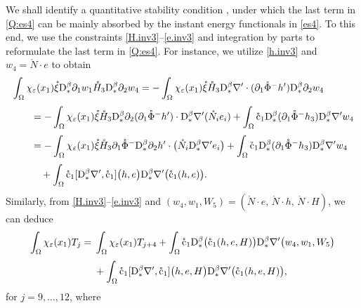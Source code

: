 \documentclass[twoside,11pt]{article}
\numberwithin{equation}{section}
\def\p{\partial}
\begin{document}
We shall identify a quantitative stability condition%
, under which
the last term in \eqref{Q:es4} can be mainly absorbed by the instant energy functionals in \eqref{es4}.
To this end, we use the constraints \eqref{H.inv3}--\eqref{e.inv3} and integration by parts to reformulate the last term in \eqref{Q:es4}.
For instance,
we utilize \eqref{h.inv3} and ${w_4}=\mathring{N}\cdot e$ to obtain
\begin{align} \nonumber
& \int_{\Omega} \chi_{\varepsilon}(x_1){\mathring{\xi} } \mathrm{D}_*^{\beta}\p_1 w_1{ \mathring{H}_3}  \mathrm{D}_*^{\beta}\p_2 {w_4}
	 =-	  \int_{\Omega} \chi_{\varepsilon}(x_1){\mathring{\xi} }{ \mathring{H}_3}   \mathrm{D}_*^{\beta}\nabla'\cdot(\p_1\mathring{\Phi}^-h')\mathrm{D}_*^{\beta}\p_2 {w_4}\\[1mm]
&\qquad =	-	   \int_{\Omega} \chi_{\varepsilon}(x_1){\mathring{\xi} }{ \mathring{H}_3}   \mathrm{D}_*^{\beta}\p_2(\p_1\mathring{\Phi}^-h') \cdot \mathrm{D}_*^{\beta}\nabla' (\mathring{N}_i e_i)
+\int_{\Omega} \mathring{\rm c}_1\mathrm{D}_*^{\beta}(\p_1\mathring{\Phi}^-h_3)\mathrm{D}_*^{\beta}\nabla' {w_4}
\nonumber\\[1mm]
&\qquad =
-	   \int_{\Omega} \chi_{\varepsilon}(x_1){\mathring{\xi} }{ \mathring{H}_3} \p_1\mathring{\Phi}^-  \mathrm{D}_*^{\beta}\p_2 h'  \cdot \big(\mathring{N}_i \mathrm{D}_*^{\beta}\nabla'  e_i\big)
+\int_{\Omega} \mathring{\rm c}_1\mathrm{D}_*^{\beta}(\p_1\mathring{\Phi}^-h_3)\mathrm{D}_*^{\beta}\nabla' {w_4}
\nonumber\\[1mm]
&\hspace*{3em}+  \int_{\Omega}\mathring{\rm c}_1[\mathrm{D}_*^{\beta}\nabla', \mathring{\rm c}_1]\big(h,e\big)\mathrm{D}_*^{\beta}\nabla' \big(\mathring{\rm c}_1(h,e)\big).
\nonumber
\end{align}
Similarly, from \eqref{H.inv3}--\eqref{e.inv3} and $({w_4}, w_1,  W_5)=(\mathring{N}\cdot e,\, \mathring{N}\cdot h,\, \mathring{N}\cdot H)$, we can deduce
\begin{align}
	 \int_{\Omega} \chi_{\varepsilon}(x_1)T_j=\;&
	  \int_{\Omega} \chi_{\varepsilon}(x_1)T_{j+4}
	 +\int_{\Omega}\mathring{\rm c}_1\mathrm{D}_*^{\beta}\big(\mathring{\rm c}_1(h,e,H)\big)\mathrm{D}_*^{\beta}\nabla' \big({w_4},w_1,W_5\big)\nonumber
	 \\[1mm]
	&+  \int_{\Omega}\mathring{\rm c}_1[\mathrm{D}_*^{\beta}\nabla', \mathring{\rm c}_1]\big(h,e,H\big)\mathrm{D}_*^{\beta}\nabla' \big(\mathring{\rm c}_1(h,e,H)\big),
	 \label{Q:es5}
\end{align}
for $j=9,\ldots,12$, where
\end{document}
